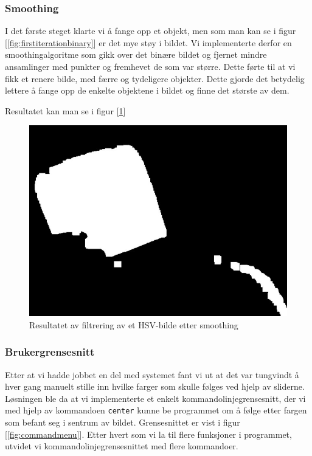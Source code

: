 \subsubsection{Smoothing}

I det første steget klarte vi å fange opp et objekt, men som man kan se i figur [\ref{fig:firstiterationbinary}] er det mye støy i bildet. Vi implementerte derfor en smoothingalgoritme som gikk over det binære bildet og fjernet mindre ansamlinger med punkter og fremhevet de som var større. Dette førte til at vi fikk et renere bilde, med færre og tydeligere objekter. Dette gjorde det betydelig lettere å fange opp de enkelte objektene i bildet og finne det største av dem.

Resultatet kan man se i figur [\ref{fig:seconditerationbinary}] 

\begin{figure}[h!]
	\centering
	\includegraphics[scale=0.45]{img/second-binary.jpg}
	\caption[Andre iterasjon binært bilde]{Resultatet av filtrering av et HSV-bilde etter smoothing}
	\label{fig:seconditerationbinary}
\end{figure}

\subsubsection{Brukergrensesnitt}

Etter at vi hadde jobbet en del med systemet fant vi ut at det var tungvindt å hver gang manuelt stille inn hvilke farger som skulle følges ved hjelp av sliderne. Løsningen ble da at vi implementerte et enkelt kommandolinjegrensesnitt, der vi med hjelp av kommandoen \texttt{center} kunne be programmet om å følge etter fargen som befant seg i sentrum av bildet. Grensesnittet er vist i figur [\ref{fig:commandmenu}]. Etter hvert som vi la til flere funksjoner i programmet, utvidet vi kommandolinjegrensesnittet med flere kommandoer.

